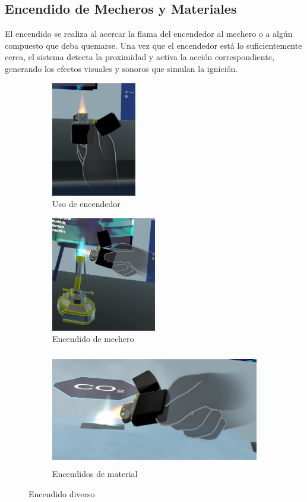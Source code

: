 \subsection{Encendido de Mecheros y Materiales}
El encendido se realiza al acercar la flama del encendedor al mechero o a algún compuesto que deba quemarse. Una vez que el encendedor está lo suficientemente cerca, el sistema detecta la proximidad y activa la acción correspondiente, generando los efectos visuales y sonoros que simulan la ignición.
\begin{figure}[thbp]
    \centering
    \begin{subfigure}[b]{0.3\linewidth}
        \includegraphics[width=\linewidth, height = 5cm]{img/chapter05/Encendido01.png}
        \caption{Uso de encendedor}
        \label{fig:Encendedor}
    \end{subfigure}
    \begin{subfigure}[b]{0.3\linewidth}
        \includegraphics[width=\linewidth, height = 5cm]{img/chapter05/Encendido02.png}
        \caption{Encendido de mechero}
        \label{fig:Mechero}
    \end{subfigure}
    \begin{subfigure}[b]{0.3\linewidth}
        \includegraphics[width=\linewidth, height = 5cm]{img/chapter05/Encendido03.png}
        \caption{Encendidos de material}
        \label{fig:Material_Encendido}
    \end{subfigure}
    \caption{Encendido diverso}
\end{figure}
